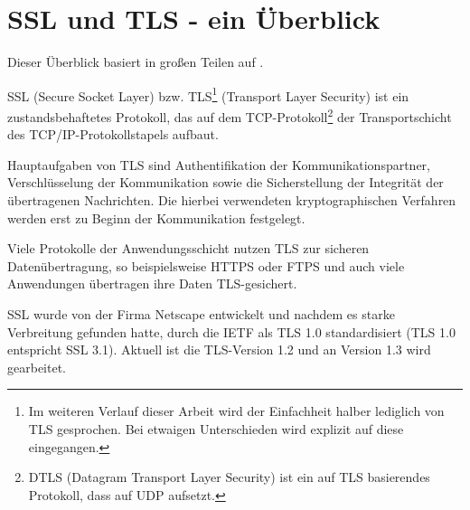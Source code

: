\chapter{SSL und TLS - ein Überblick}

Dieser Überblick basiert in großen Teilen auf \cite{schmeh09}.

SSL (Secure Socket Layer) bzw. TLS\footnote{Im weiteren Verlauf dieser Arbeit wird der Einfachheit halber lediglich von TLS gesprochen. Bei etwaigen Unterschieden wird explizit auf diese eingegangen.} (Transport Layer Security) ist ein zustandsbehaftetes Protokoll, das auf dem TCP-Protokoll\footnote{DTLS (Datagram Transport Layer Security) ist ein auf TLS basierendes Protokoll, dass auf UDP aufsetzt.} der Transportschicht des TCP/IP-Protokollstapels aufbaut. 

Hauptaufgaben von TLS sind Authentifikation der Kommunikationspartner, Verschlüsselung der Kommunikation sowie die Sicherstellung der Integrität der übertragenen Nachrichten. Die hierbei verwendeten kryptographischen Verfahren werden erst zu Beginn der Kommunikation festgelegt. 

Viele Protokolle der Anwendungsschicht nutzen TLS zur sicheren Datenübertragung, so beispielsweise HTTPS oder FTPS und auch viele Anwendungen übertragen ihre Daten TLS-gesichert.

SSL wurde von der Firma Netscape entwickelt und nachdem es starke Verbreitung gefunden hatte, durch die IETF als TLS 1.0 standardisiert (TLS 1.0 entspricht SSL 3.1). Aktuell ist die TLS-Version 1.2 und an Version 1.3 wird gearbeitet.

